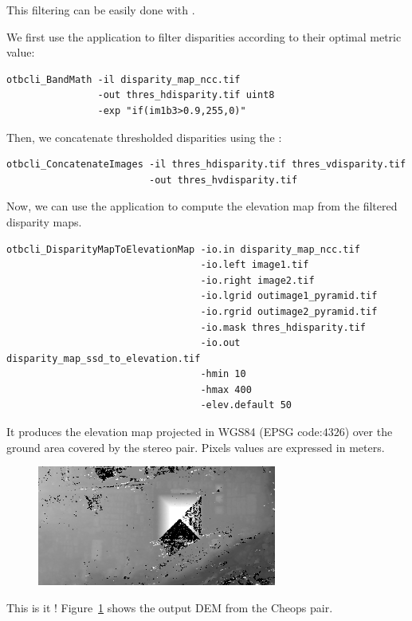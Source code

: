 This filtering can be easily done with \app.

We first use the  application to filter
disparities according to their optimal metric value:

\begin{verbatim}
otbcli_BandMath -il disparity_map_ncc.tif
                -out thres_hdisparity.tif uint8
                -exp "if(im1b3>0.9,255,0)"
\end{verbatim}

Then, we concatenate thresholded disparities using the :

\begin{verbatim}
otbcli_ConcatenateImages -il thres_hdisparity.tif thres_vdisparity.tif
                         -out thres_hvdisparity.tif
\end{verbatim}

Now, we can use the  application to
compute the elevation map from the filtered disparity maps.

\begin{verbatim}
otbcli_DisparityMapToElevationMap -io.in disparity_map_ncc.tif
                                  -io.left image1.tif
                                  -io.right image2.tif
                                  -io.lgrid outimage1_pyramid.tif
                                  -io.rgrid outimage2_pyramid.tif
                                  -io.mask thres_hdisparity.tif
                                  -io.out disparity_map_ssd_to_elevation.tif
                                  -hmin 10
                                  -hmax 400
                                  -elev.default 50
\end{verbatim}

It produces the elevation map projected in WGS84 (EPSG code:$4326$) over the
ground area covered by the stereo pair. Pixels values are expressed in meters.

\begin{figure}[!h]
  \center
  \includegraphics[width=0.7\textwidth]{../Art/MonteverdiImages/stereo_dem_zoom.png}
  \label{fig:stereo_out}
\end{figure}

This is it ! Figure~\ref{fig:stereo_out} shows the output DEM from the Cheops pair.
